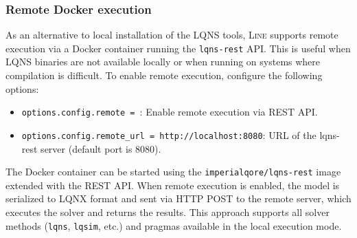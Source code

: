 \subsubsection{Remote Docker execution}
As an alternative to local installation of the LQNS tools, \textsc{Line} supports remote execution via a Docker container running the \texttt{lqns-rest} API. This is useful when LQNS binaries are not available locally or when running on systems where compilation is difficult. To enable remote execution, configure the following options:
\begin{itemize}
\item \texttt{options.config.remote = }: Enable remote execution via REST API.
\item \texttt{options.config.remote\_url = http://localhost:8080}: URL of the lqns-rest server (default port is 8080).
\end{itemize}
The Docker container can be started using the \texttt{imperialqore/lqns-rest} image extended with the REST API. When remote execution is enabled, the model is serialized to LQNX format and sent via HTTP POST to the remote server, which executes the solver and returns the results. This approach supports all solver methods (\texttt{lqns}, \texttt{lqsim}, etc.) and pragmas available in the local execution mode.

